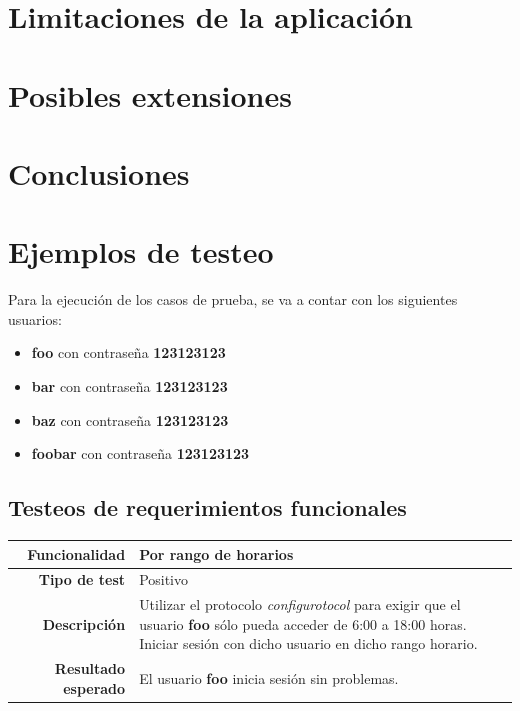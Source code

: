 \documentclass[a4paper,10pt]{article}
\begin{document}
\section{Limitaciones de la aplicación}

\section{Posibles extensiones}

\section{Conclusiones}

\section{Ejemplos de testeo}
Para la ejecución de los casos de prueba, se va a contar con los siguientes usuarios:
\begin{itemize}
 \item \textbf{foo} con contraseña \textbf{123123123}
 \item \textbf{bar} con contraseña \textbf{123123123}
 \item \textbf{baz} con contraseña \textbf{123123123}
 \item \textbf{foobar} con contraseña \textbf{123123123}
\end{itemize}

\subsection{Testeos de requerimientos funcionales}

\begin{center}
  \begin{tabular}{|r|p{12.5cm}|}
    \hline
    \textbf{Funcionalidad}	&	Por rango de horarios\\
    \hline
    \textbf{Tipo de test}	&	Positivo\\
    \hline
    \textbf{Descripción}	&	Utilizar el protocolo \textit{configurotocol} para exigir que el usuario
					\textbf{foo} sólo pueda acceder de 6:00 a 18:00 horas. Iniciar sesión con
					dicho usuario en dicho rango horario.\\
    \hline
    \textbf{Resultado esperado}	&	El usuario \textbf{foo} inicia sesión sin problemas.\\
    \hline   
  \end{tabular}
\end{center}
\end{document}
